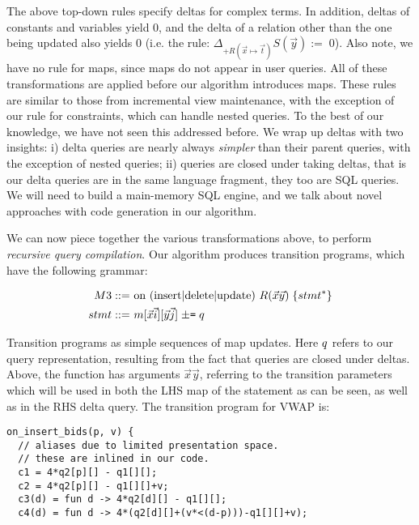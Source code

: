 {The above top-down rules specify deltas for complex terms. In addition, deltas
of constants and variables yield 0, and the delta of a relation other than the
one being updated also yields 0 (i.e. the rule: $\Delta_{+R(\vec{x} \mapsto
\vec{t})} S(\vec{y}) := \; 0$). Also note, we have no rule for maps, since maps
do not appear in user queries. All of these transformations are applied before
our algorithm introduces maps. These rules are similar to those from
incremental view maintenance, with the exception of our rule for constraints,
which can handle nested queries. To the best of our knowledge, we have not seen
this addressed before. We wrap up deltas with two insights: i) delta queries are
nearly always \textit{simpler} than their parent queries, with the exception of
nested queries; ii) queries are closed under taking deltas, that is our delta
queries are in the same language fragment, they too are SQL queries.
We will need to build a main-memory SQL engine, and we talk about novel
approaches with code generation in our algorithm.

We can now piece together the various transformations above, to perform
\textit{recursive query compilation}. Our algorithm produces transition
programs, which have the following grammar:

\vspace{-3mm}
\begin{align*}
M3    & \; \mbox{::= on (insert$|$delete$|$update) }
           R(\vec{x}\vec{y}) \; \{ stmt^* \}\\
\comment{event & \; \mbox{::= insert $|$ delete}\\}
stmt  & \; \mbox{::= } m[\vec{x}\vec{i}][\vec{y}\vec{j}] \;
                       \mbox{{\tt $\pm$=}} \; \q\\
\end{align*}

\noindent Transition programs as simple sequences of map updates.
Here $q$ refers to our query representation, resulting from the fact that
queries are closed under deltas. Above, the function has arguments
$\vec{x}\vec{y}$, referring to the transition parameters which will be used in
both the LHS map of the statement as can be seen, as well as in the RHS delta
query.
The transition program for VWAP is:

\begin{verbatim}
on_insert_bids(p, v) {
  // aliases due to limited presentation space.
  // these are inlined in our code.
  c1 = 4*q2[p][] - q1[][];
  c2 = 4*q2[p][] - q1[][]+v;
  c3(d) = fun d -> 4*q2[d][] - q1[][];
  c4(d) = fun d -> 4*(q2[d][]+(v*<(d-p)))-q1[][]+v);


\end{verbatim}}
